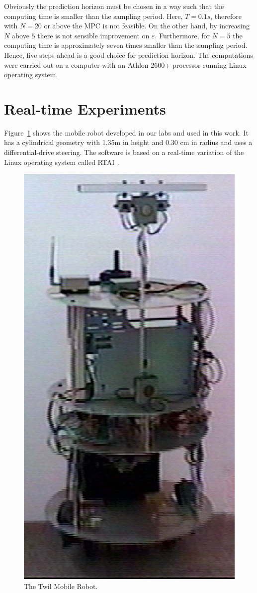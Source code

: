 \documentclass[conference]{IEEEtran} %
\begin{document}
Obviously the prediction horizon must be chosen in a way such that the
computing time is smaller than the sampling period. Here, $T=0.1 s$,
therefore with $N=20$ or above the MPC is not feasible. On the other hand,
by increasing $N$ above $5$ there is not sensible improvement on
$\varepsilon$. Furthermore, for $N=5$ the computing time is approximately seven
times smaller than the sampling period. Hence, five steps ahead is a good
choice for prediction horizon. The computations were carried out on a
computer with an Athlon 2600+ processor running Linux operating system. 
 
\section{Real-time Experiments}
\label{sec:exp}

Figure~\ref{fig:twil} shows the mobile robot developed in our labs and used in
this work. It has a cylindrical geometry with 1.35m in height and 0.30 cm in
radius and uses a differential-drive steering. The software is based on a
real-time variation of the Linux operating system called
RTAI~\cite{Dozio:2003}.

\begin{figure}[htbp]
	\centering
	\includegraphics[width=0.65\linewidth]{Figures/twil6.ps}
	\caption{The Twil Mobile Robot.}
	\label{fig:twil}
\end{figure}
\end{document}
